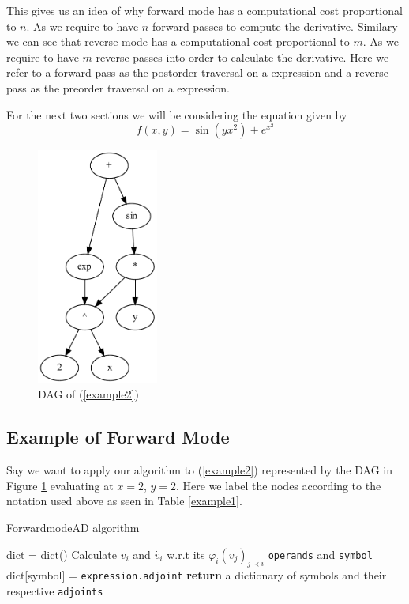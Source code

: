 \documentclass{article}
\begin{document}
This gives us an idea of why forward mode has a computational cost proportional to $n$. As we require to have $n$ forward passes to compute the derivative. Similary we can see that reverse mode has a computational cost proportional to $m$. As we require to have $m$ reverse passes into order to calculate the derivative. Here we refer to a forward pass as the postorder traversal on a expression and a reverse pass as the preorder traversal on a expression.

For the next two sections we will be considering the equation given by
\begin{equation}
    \label{example2}
    f(x,y) = \sin(yx^2) + e^{x^2}
\end{equation}


\begin{figure}[h!]
    \includegraphics[width=4cm]{images/Graph_Example2.pdf}
    \caption{DAG of (\ref{example2})}
    \label{fig:DAGgraph}
\end{figure}

\subsection{Example of Forward Mode}

Say we want to apply our algorithm to (\ref{example2}) represented by the DAG in Figure \ref{fig:DAGgraph} evaluating at $x=2$, $y=2$. Here we label the nodes according to the notation used above as seen in Table \ref{example1}. 



\begin{algorithm}[h]
\caption{ForwardmodeAD algorithm}\label{forwardAD}
\begin{algorithmic}[1]
\State dict = dict()\Comment{}
    \State Calculate $v_i$ and $\Dot{v_i}$ w.r.t its $\varphi_i(v_j)_{j \prec i}$ \verb|operands| and \verb|symbol|
    \State dict[symbol] = \verb|expression.adjoint|
    \EndFor
\EndFor
\State \textbf{return} a dictionary of symbols and their respective \verb|adjoints|
\EndProcedure
\end{algorithmic}
\end{algorithm}
\end{document}
